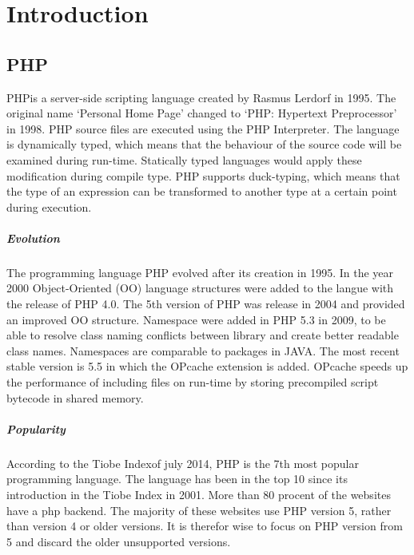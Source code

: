 \documentclass[../main.tex]{subfiles}
\begin{document}
    \chapter{Introduction}\label{chap:introduction}

    \section{PHP} %
        PHP\footnotemark is a server-side scripting language created by Rasmus Lerdorf in 1995.
        The original name `Personal Home Page' changed to `PHP: Hypertext Preprocessor' in 1998.
        PHP source files are executed using the PHP Interpreter. 
        The language is dynamically typed, which means that the behaviour of the source code will be examined during run-time.
        Statically typed languages would apply these modification during compile type.
        PHP supports duck-typing, which means that the type of an expression can be transformed to another type at a certain point during execution.
        
        \paragraph{Evolution}
        The programming language PHP evolved after its creation in 1995.
        In the year 2000 Object-Oriented (OO) language structures were added to the langue with the release of PHP 4.0.
        The 5th version of PHP was release in 2004 and provided an improved OO structure.
        Namespace were added in PHP 5.3 in 2009, to be able to resolve class naming conflicts between library and create better readable class names.
        Namespaces are comparable to packages in JAVA.
        The most recent stable version is 5.5 in which the OPcache extension is added. 
        OPcache speeds up the performance of including files on run-time by storing precompiled script bytecode in shared memory.
       
        \paragraph{Popularity}
        According to the Tiobe Index\footnotemark of july 2014, PHP is the 7th most popular programming language.
        The language has been in the top 10 since its introduction in the Tiobe Index in 2001.
        More than 80 procent of the websites have a php backend\footnotemark.
        The majority of these websites use PHP version 5, rather than version 4 or older versions.
        It is therefor wise to focus on PHP version from 5 and discard the older unsupported versions.
            
\end{document}
